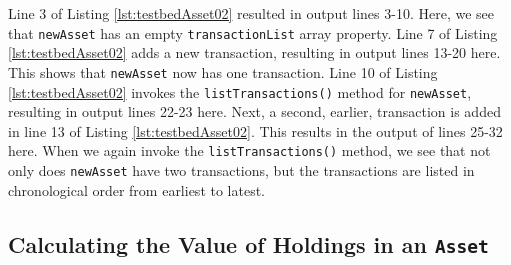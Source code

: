 Line 3 of Listing \ref{lst:testbedAsset02} resulted in output lines 3-10. Here, we see that \texttt{newAsset} has an empty \texttt{transactionList} array property. Line 7 of Listing \ref{lst:testbedAsset02} adds a new transaction, resulting in output lines 13-20 here. This shows that \texttt{newAsset} now has one transaction. Line 10 of Listing \ref{lst:testbedAsset02} invokes the \texttt{listTransactions()} method for \texttt{newAsset}, resulting in output lines 22-23 here. Next, a second, earlier, transaction is added in line 13 of Listing \ref{lst:testbedAsset02}. This results in the output of lines 25-32 here. When we again invoke the \texttt{listTransactions()} method, we see that not only does \texttt{newAsset} have two transactions, but the transactions are listed in chronological order from earliest to latest.

\subsection{Calculating the Value of Holdings in an \texttt{Asset}} \label{subsect:CalculateAssetValue}

